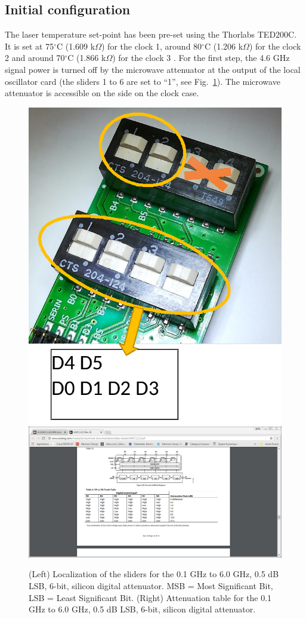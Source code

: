 \documentclass[a4paper,11pt]{article}
\begin{document}


\subsection{Initial configuration}
The laser temperature set-point has been pre-set using the Thorlabs TED200C. It is set at 75$^\circ$C (1.609 k$\Omega$) for the clock 1, around 80$^\circ$C (1.206 k$\Omega$) for the clock 2 and around 70$^\circ$C (1.866 k$\Omega$) for the clock 3 .
For the first step, the 4.6 GHz signal power is turned off by the microwave attenuator at the output of the local oscillator card (the sliders 1 to 6 are set to “1”, see Fig.~\ref{fig:attenuation}). The microwave attenuator is accessible on the side on the clock case.

\begin{figure}[h!]
	\centering
		\includegraphics[width=0.19\linewidth]{attenuation}
	    \includegraphics[width=0.8\linewidth,trim={8cm 4.2cm 12.5cm 9.1cm},clip]{attenuation-table}
	\caption{(Left) Localization of the sliders for the 0.1 GHz to 6.0 GHz, 0.5 dB LSB, 6-bit, silicon digital attenuator. MSB = Most Significant Bit, LSB = Least Significant Bit. (Right) Attenuation table for the 0.1 GHz to 6.0 GHz, 0.5 dB LSB, 6-bit, silicon digital attenuator.}
	\label{fig:attenuation}
\end{figure}
\end{document}
